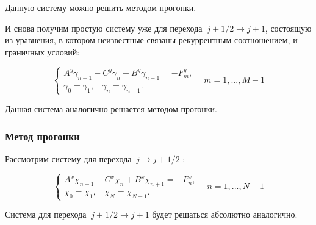\documentclass[a4paper]{article}
\begin{document}
Данную систему можно решить методом прогонки.

И снова получим простую систему уже для перехода $~j + 1/2\longrightarrow j+1$, состоящую из уравнения, в котором неизвестные связаны рекуррентным соотношением, и граничных условий:

\begin{equation}
\begin{cases}
A^y \gamma_{n-1} - C^y \gamma_n +B^y \gamma_{n+1} = -F^y_m,\\
\gamma_0=\gamma_1,~~~~\gamma_n=\gamma_{n-1}.
\end{cases}~~~~m=1,...,M-1
\end{equation}

Данная система аналогично решается методом прогонки.

\subsubsection{Метод прогонки}
Рассмотрим систему для перехода $~j\longrightarrow j+1/2$ :

\begin{equation}
\begin{cases}
A^x \chi_{n-1} - C^x \chi_n +B^x \chi_{n+1} = -F^x_n,\\
\chi_0=\chi_1,~~~~\chi_N=\chi_{N-1}.
\end{cases}~~~~n=1,...,N-1
\end{equation}

Система для перехода $~j + 1/2\longrightarrow j+1$ будет решаться абсолютно аналогично.
\end{document}
